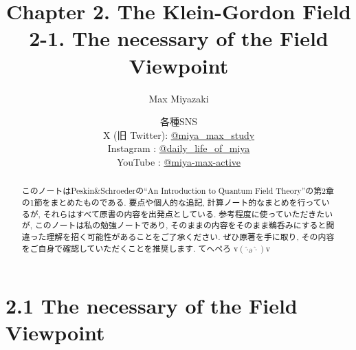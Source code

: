 \documentclass[a4paper,12pt]{article}
\title{Chapter 2. The Klein-Gordon Field\\
2-1. The necessary of the Field Viewpoint}
\date{各種SNS\\
    X (旧 Twitter): \href{https://x.com/miya_max_study}{@miya\_max\_study}\\
    Instagram : \href{https://www.instagram.com/daily_life_of_miya/}{@daily\_life\_of\_miya}\\
    YouTube : \href{https://www.youtube.com/@miya-max-active}{@miya-max-active}
    }
\author{Max Miyazaki}
\begin{document}
\maketitle

\vspace{1cm}
\begin{abstract}
    このノートはPeskin\&Schroederの``An Introduction to Quantum Field Theory''の第2章の1節をまとめたものである. 要点や個人的な追記, 計算ノート的なまとめを行っているが, それらはすべて原書の内容を出発点としている. 参考程度に使っていただきたいが, このノートは私の勉強ノートであり, そのままの内容をそのまま鵜呑みにすると間違った理解を招く可能性があることをご了承ください. ぜひ原著を手に取り, その内容をご自身で確認していただくことを推奨します. てへぺろ v$({\hat{\cdot}_\partial \hat{\cdot}})$v



\end{abstract}
    
    

\newpage
\section*{2.1 The necessary of the Field Viewpoint}
\end{document}
